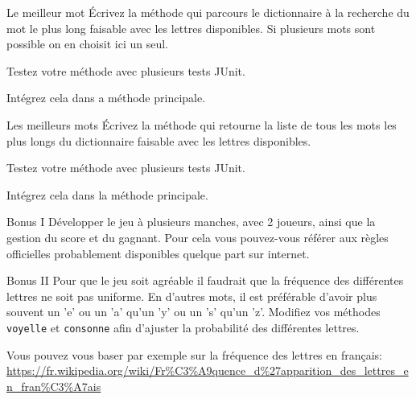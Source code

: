 \documentclass[a4paper,11pt]{article}
\begin{document}
 	\begin{Exercice}{Le meilleur mot}
 	 	\'Ecrivez la méthode 
		qui parcours le dictionnaire à la recherche du mot le plus long faisable 
		avec les lettres disponibles. 
		Si plusieurs mots sont possible on en choisit ici un seul.

		Testez votre méthode avec plusieurs tests JUnit.

		 Intégrez cela dans a méthode principale.
	\end{Exercice}

 	\begin{Exercice}{Les meilleurs mots}
 	 	\'Ecrivez la méthode 
		qui retourne la liste de tous les mots les plus longs du dictionnaire 
		faisable avec les lettres disponibles.

		Testez votre méthode avec plusieurs tests JUnit.

		Intégrez cela dans la méthode principale.
	\end{Exercice}


 	\begin{Exercice}{Bonus I}
		Développer le jeu à plusieurs manches, avec 2 joueurs, 
		ainsi que la gestion du score et du gagnant.
		Pour cela vous pouvez-vous référer aux règles officielles probablement 
		disponibles quelque part sur internet.
	\end{Exercice}
		
 	\begin{Exercice}{Bonus II}
		Pour que le jeu soit agréable il faudrait que la fréquence des différentes
		lettres ne soit pas uniforme. En d'autres mots, il est préférable d'avoir plus
		souvent un 'e' ou un 'a' qu'un 'y' ou un 's' qu'un 'z'. Modifiez vos méthodes
		\texttt{voyelle} et \texttt{consonne} afin d'ajuster la probabilité des
		différentes lettres. 
		
		Vous pouvez vous baser par exemple sur la fréquence des lettres en français:
		 \url{https://fr.wikipedia.org/wiki/Fr%C3%A9quence_d%27apparition_des_lettres_en_fran%C3%A7ais}
	\end{Exercice}
		
\end{document}
